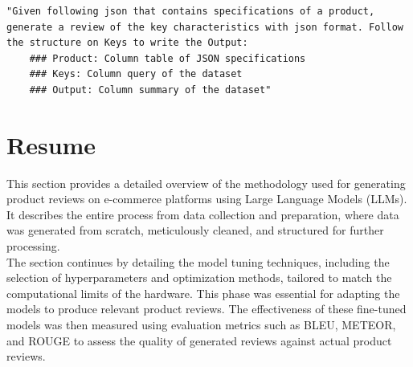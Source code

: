 \begin{lstlisting}[style=textstyle, frame = single, caption=Prompt structuration for QTSumm, label=code:Prompt Dataset 2]
    "Given following json that contains specifications of a product, generate a review of the key characteristics with json format. Follow the structure on Keys to write the Output: 
    ### Product: Column table of JSON specifications
    ### Keys: Column query of the dataset
    ### Output: Column summary of the dataset"
    \end{lstlisting}

\section{Resume}
This section provides a detailed overview of the methodology used for generating product reviews on e-commerce platforms using Large Language Models (LLMs). It describes the entire process from data collection and preparation, where data was generated from scratch, meticulously cleaned, and structured for further processing.
\\

The section continues by detailing the model tuning techniques, including the selection of hyperparameters and optimization methods, tailored to match the computational limits of the hardware. This phase was essential for adapting the models to produce relevant product reviews. The effectiveness of these fine-tuned models was then measured using evaluation metrics such as BLEU, METEOR, and ROUGE to assess the quality of generated reviews against actual product reviews.